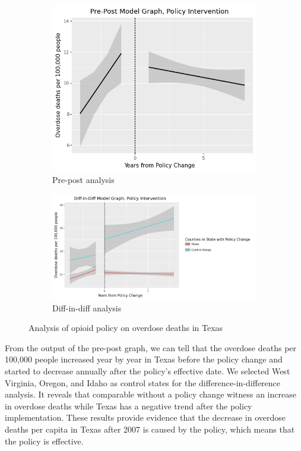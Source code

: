 \documentclass[12pt,letterpaper]{article}
\begin{document}
\begin{figure}[!h]
\centering
\begin{subfigure}{.5\textwidth}
  \centering
  \includegraphics[width=0.7\linewidth]{../30_results/General_Results/texas_overdose_death_prepost.png}
  \caption{Pre-post analysis}
  \label{fig:tx_death_prepost}
\end{subfigure}%
\begin{subfigure}{.55\textwidth}
  \centering
  \includegraphics[width=1\linewidth]{../30_results/General_Results/texas_overdose_death_diffdiff.png}
  \caption{Diff-in-diff analysis}
  \label{fig:tx_death_did}
\end{subfigure}
\caption{Analysis of opioid policy on overdose deaths in Texas}
\label{fig:tx_death}
\end{figure}

From the output of the pre-post graph, we can tell that the overdose deaths per 100,000 people increased year by year in Texas before the policy change and started to decrease annually after the policy's effective date. We selected West Virginia, Oregon, and Idaho as control states for the difference-in-difference analysis. It reveals that comparable without a policy change witness an increase in overdose deaths while Texas has a negative trend after the policy implementation. These results provide evidence that the decrease in overdose deaths per capita in Texas after 2007 is caused by the policy, which means that the policy is effective.
\end{document}
